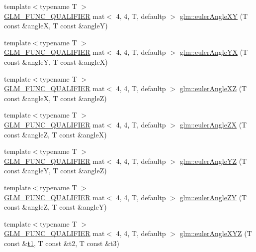 \begin{DoxyCompactItemize}
\item 
{\footnotesize template$<$typename T $>$ }\\\mbox{\hyperlink{setup_8hpp_a33fdea6f91c5f834105f7415e2a64407}{G\+L\+M\+\_\+\+F\+U\+N\+C\+\_\+\+Q\+U\+A\+L\+I\+F\+I\+ER}} mat$<$ 4, 4, T, defaultp $>$ \mbox{\hyperlink{group__gtx__euler__angles_ga64036577ee17a2d24be0dbc05881d4e2}{glm\+::euler\+Angle\+XY}} (T const \&angleX, T const \&angleY)
\item 
{\footnotesize template$<$typename T $>$ }\\\mbox{\hyperlink{setup_8hpp_a33fdea6f91c5f834105f7415e2a64407}{G\+L\+M\+\_\+\+F\+U\+N\+C\+\_\+\+Q\+U\+A\+L\+I\+F\+I\+ER}} mat$<$ 4, 4, T, defaultp $>$ \mbox{\hyperlink{group__gtx__euler__angles_ga4f57e6dd25c3cffbbd4daa6ef3f4486d}{glm\+::euler\+Angle\+YX}} (T const \&angleY, T const \&angleX)
\item 
{\footnotesize template$<$typename T $>$ }\\\mbox{\hyperlink{setup_8hpp_a33fdea6f91c5f834105f7415e2a64407}{G\+L\+M\+\_\+\+F\+U\+N\+C\+\_\+\+Q\+U\+A\+L\+I\+F\+I\+ER}} mat$<$ 4, 4, T, defaultp $>$ \mbox{\hyperlink{group__gtx__euler__angles_gaa39bd323c65c2fc0a1508be33a237ce9}{glm\+::euler\+Angle\+XZ}} (T const \&angleX, T const \&angleZ)
\item 
{\footnotesize template$<$typename T $>$ }\\\mbox{\hyperlink{setup_8hpp_a33fdea6f91c5f834105f7415e2a64407}{G\+L\+M\+\_\+\+F\+U\+N\+C\+\_\+\+Q\+U\+A\+L\+I\+F\+I\+ER}} mat$<$ 4, 4, T, defaultp $>$ \mbox{\hyperlink{group__gtx__euler__angles_ga483903115cd4059228961046a28d69b5}{glm\+::euler\+Angle\+ZX}} (T const \&angleZ, T const \&angleX)
\item 
{\footnotesize template$<$typename T $>$ }\\\mbox{\hyperlink{setup_8hpp_a33fdea6f91c5f834105f7415e2a64407}{G\+L\+M\+\_\+\+F\+U\+N\+C\+\_\+\+Q\+U\+A\+L\+I\+F\+I\+ER}} mat$<$ 4, 4, T, defaultp $>$ \mbox{\hyperlink{group__gtx__euler__angles_ga220379e10ac8cca55e275f0c9018fed9}{glm\+::euler\+Angle\+YZ}} (T const \&angleY, T const \&angleZ)
\item 
{\footnotesize template$<$typename T $>$ }\\\mbox{\hyperlink{setup_8hpp_a33fdea6f91c5f834105f7415e2a64407}{G\+L\+M\+\_\+\+F\+U\+N\+C\+\_\+\+Q\+U\+A\+L\+I\+F\+I\+ER}} mat$<$ 4, 4, T, defaultp $>$ \mbox{\hyperlink{group__gtx__euler__angles_ga400b2bd5984999efab663f3a68e1d020}{glm\+::euler\+Angle\+ZY}} (T const \&angleZ, T const \&angleY)
\item 
{\footnotesize template$<$typename T $>$ }\\\mbox{\hyperlink{setup_8hpp_a33fdea6f91c5f834105f7415e2a64407}{G\+L\+M\+\_\+\+F\+U\+N\+C\+\_\+\+Q\+U\+A\+L\+I\+F\+I\+ER}} mat$<$ 4, 4, T, defaultp $>$ \mbox{\hyperlink{group__gtx__euler__angles_ga1975e0f0e9bed7f716dc9946da2ab645}{glm\+::euler\+Angle\+X\+YZ}} (T const \&\mbox{\hyperlink{_s_d_l__opengl__glext_8h_af48031a37b713afa3b0d0d7d29653d7c}{t1}}, T const \&t2, T const \&t3)

\end{DoxyCompactItemize}
